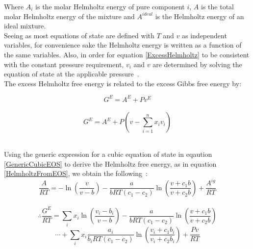 
Where $A_{i}$ is the molar Helmholtz energy of pure component $i$, $A$ is the total molar Helmholtz energy of the mixture and $A^{ideal}$ is the Helmholtz energy of an ideal mixture.\\

Seeing as most equations of state are defined with $T$ and $v$ as independent variables, for convenience sake the Helmholtz energy is written as a function of the same variables. Also, in order for equation \ref{ExcessHelmholtz} to be consistent with the constant pressure requirement, $v_{i}$ and $v$ are determined by solving the equation of state at the applicable pressure~\cite{ThermophysicalProperties}.\\

The excess Helmholtz free energy is related to the excess Gibbs free energy by:\

\begin{equation}
G^{E} = A^{E} + Pv^{E}
\end{equation}\
\begin{equation}
G^{E} = A^{E} + P\left(v - \sum_{i=1}^{n} x_{i}v_{i}\right)
\end{equation}\

Using the generic expression for a cubic equation of state in eqaution \ref{GenericCubicEOS} to derive the Helmholtz free energy, as in equation \ref{HelmholtzFromEOS}, we obtain the following~\cite{ThermophysicalProperties}:\
\begin{equation}
\dfrac{A}{RT} = -\ln \left(\dfrac{v}{v - b}\right) - \dfrac{a}{bRT\left(c_{1}- c_{2}\right)}\ln \left(\dfrac{v + c_{1}b}{v + c_{2}b}\right) + \dfrac{A^{ig}}{RT}
\end{equation}\
\begin{equation*}
\therefore \dfrac{G^{E}}{RT} =\sum_{i}x_{i}\ln \left(\dfrac{v_{i} - b_{i}}{v - b}\right) - \dfrac{a}{bRT\left(c_{1}- c_{2}\right)}\ln \left(\dfrac{v + c_{1}b}{v + c_{2}b}\right)
\end{equation*}
\begin{equation}
\cdots + \sum_{i} x_{i} \dfrac{a_{i}}{b_{i}RT\left(c_{1}- c_{2}\right)}\ln \left(\dfrac{v_{i} + c_{1}b_{i}}{v_{i} + c_{2}b_{i}}\right) + \dfrac{Pv}{RT} \label{ExcessGibbsfromEOS}
\end{equation}

